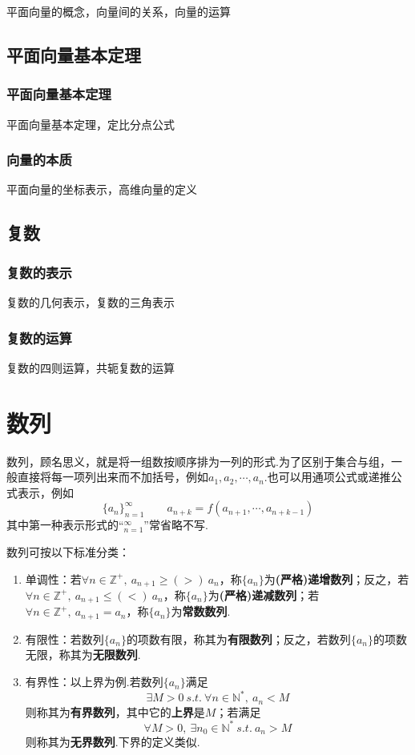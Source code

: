 \documentclass[lang=cn, zihao=4.5]{elegantbook}
\begin{document}
平面向量的概念，向量间的关系，向量的运算

\section{平面向量基本定理}

\subsection{平面向量基本定理}

平面向量基本定理，定比分点公式

\subsection{向量的本质}

平面向量的坐标表示，高维向量的定义

\section{复数}

\subsection{复数的表示}

复数的几何表示，复数的三角表示

\subsection{复数的运算}

复数的四则运算，共轭复数的运算

\chapter{数列}

数列，顾名思义，就是将一组数按顺序排为一列的形式.为了区别于集合与组，一般直接将每一项列出来而不加括号，例如$a_1,a_2, \cdots ,a_n$.也可以用通项公式或递推公式表示，例如
$$\{ a_n \}_{n=1}^{\infty} \qquad a_{n+k}=f(a_{n+1}, \cdots ,a_{n+k-1})$$
其中第一种表示形式的“$_{n=1}^{\infty}$”常省略不写.

数列可按以下标准分类：
\begin{enumerate}
	\item 单调性：若$\forall n \in \mathbb{Z}^+,~ a_{n+1} \geq (>)~ a_n$，称$\{ a_n \}$为\textbf{(严格)递增数列}；反之，若$\forall n \in \mathbb{Z}^+,~ a_{n+1} \leq (<)~ a_n$，称$\{ a_n \}$为\textbf{(严格)递减数列}；若$\forall n \in \mathbb{Z}^+,~ a_{n+1} = a_n$，称$\{ a_n \}$为\textbf{常数数列}.
	\item 有限性：若数列$\{ a_n \}$的项数有限，称其为\textbf{有限数列}；反之，若数列$\{ a_n \}$的项数无限，称其为\textbf{无限数列}.
	\item 有界性：以上界为例.若数列$\{ a_n \}$满足
	$$\exists M > 0 ~s.t.~ \forall n \in \mathbb{N}^{*},~ a_n<M$$
	则称其为\textbf{有界数列}，其中它的\textbf{上界}是$M$；若满足
	$$\forall M > 0 ,~ \exists n_0 \in \mathbb{N}^{*} ~s.t.~ a_n>M$$
	则称其为\textbf{无界数列}.下界的定义类似.
\end{enumerate}
\end{document}

